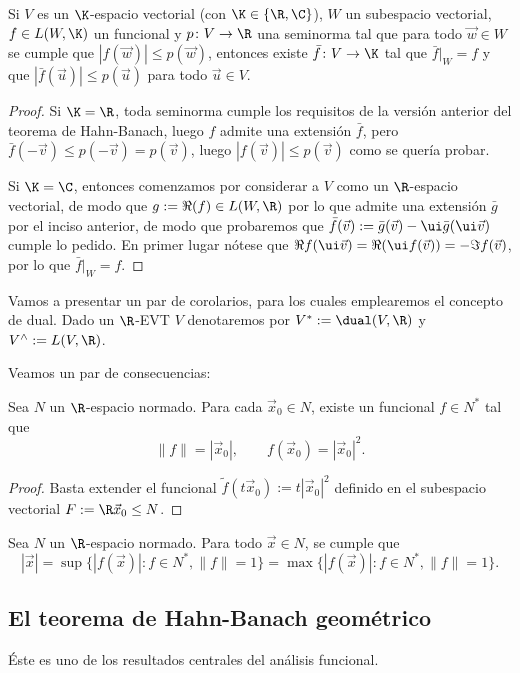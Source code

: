 \documentclass[topologia-analisis.tex]{subfiles}
\begin{document}
\begin{thmi}
	Si $V$ es un $\K$-espacio vectorial (con $\K\in\{\R,\C\}$),
	$W$ un subespacio vectorial, $f\in L(W,\K)$ un funcional y $p\colon V\to\R$ una seminorma tal que para todo $\vec w\in W$
	se cumple que $|f(\vec w)| \le p(\vec w)$, entonces existe $\bar f\colon V\to\K$ tal que $\bar f|_W = f$ y que
	$|\bar f(\vec u)| \le p(\vec u)$ para todo $\vec u\in V$.
\end{thmi}
\begin{proof}
	Si $\K = \R$, toda seminorma cumple los requisitos de la versión anterior del teorema de Hahn-Banach,
	luego $f$ admite una extensión $\bar f$, pero $\bar f(-\vec v) \le p(-\vec v) = p(\vec v)$, luego $|f(\vec v)| \le p(\vec v)$ como se quería probar.
	\par
	Si $\K = \C$, entonces comenzamos por considerar a $V$ como un $\R$-espacio vectorial,
	de modo que $g := \Re(f) \in L(W,\R)$ por lo que admite una extensión $\bar g$ por el inciso anterior,
	de modo que probaremos que $\bar f(\vec v) := \bar g(\vec v) - \ui\bar g(\ui\vec v)$ cumple lo pedido.
	En primer lugar nótese que $\Re f(\ui\vec v) = \Re( \ui f(\vec v) ) = -\Im f(\vec v)$, por lo que $\bar f|_W = f$.
\end{proof}
\thmdep{}

Vamos a presentar un par de corolarios, para los cuales emplearemos el concepto de dual.
Dado un $\R$-EVT $V$ denotaremos por $V^* := \dual(V, \R)$ y $V^\wedge := L(V, \R)$.

Veamos un par de consecuencias:
\begin{cor}
	Sea $N$ un $\R$-espacio normado.
	Para cada $\vec x_0 \in N$, existe un funcional $f \in N^*$ tal que
	\[
		\|f\| = |\vec x_0|, \qquad f(\vec x_0) = |\vec x_0|^2.
	\]
\end{cor}
\begin{proof}
	Basta extender el funcional $\tilde f(t\vec x_0) := t|\vec x_0|^2$ definido en el subespacio vectorial $F := \R\vec x_0 \le N$.
\end{proof}
\begin{cor}
	Sea $N$ un $\R$-espacio normado.
	Para todo $\vec x \in N$, se cumple que
	\[
		|\vec x| = \sup\{ |f(\vec x)| : f \in N^*, \|f\| = 1 \} = \max\{ |f(\vec x)| : f \in N^*, \|f\| = 1 \}.
	\]
\end{cor}

\subsection{El teorema de Hahn-Banach geométrico}
Éste es uno de los resultados centrales del análisis funcional.
\end{document}
